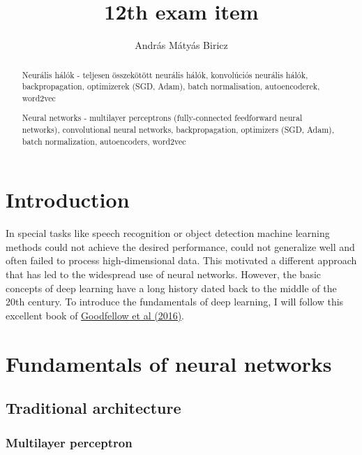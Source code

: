 \documentclass[12pt]{article}
\theoremstyle{plain}
\begin{document}
\title{12th exam item}
\author{András Mátyás Biricz}

\maketitle


\begin{abstract}
	\centering
    Neurális hálók - teljesen összekötött neurális hálók, konvolúciós neurális hálók, backpropagation, optimizerek (SGD, Adam), batch normalisation, autoencoderek, word2vec
	
    Neural networks - multilayer perceptrons (fully-connected feedforward neural networks), convolutional neural networks, backpropagation, optimizers (SGD, Adam), batch normalization, autoencoders, word2vec
\end{abstract}

\vfill

\tableofcontents

\newpage

\section{Introduction}

In special tasks like speech recognition or object detection machine learning methods could not achieve the desired performance, could not generalize well and often failed to process high-dimensional data. This motivated a different approach that has led to the widespread use of neural networks. However, the basic concepts of deep learning have a long history dated back to the middle of the 20th century. To introduce the fundamentals of deep learning, I will follow this excellent book of \hyperlink{Deeplea_Goodfellow}{Goodfellow et al (2016)}.

\section{Fundamentals of neural networks}

\subsection{Traditional architecture}

\subsubsection{Multilayer perceptron}
\end{document}
